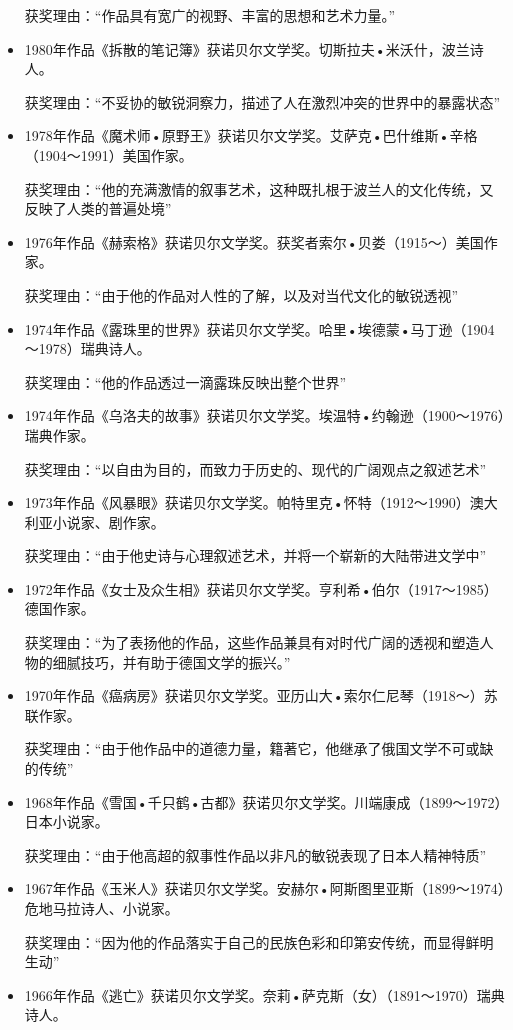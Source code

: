 \documentclass[UTF8,a4paper,8pt]{ctexbook}
\begin{document}
\begin{itemize}
			获奖理由：“作品具有宽广的视野、丰富的思想和艺术力量。”
			\item 1980年作品《拆散的笔记簿》获诺贝尔文学奖。切斯拉夫•米沃什，波兰诗人。
			
			获奖理由：“不妥协的敏锐洞察力，描述了人在激烈冲突的世界中的暴露状态”
			\item 1978年作品《魔术师•原野王》获诺贝尔文学奖。艾萨克•巴什维斯•辛格（1904～1991）美国作家。
			
			获奖理由：“他的充满激情的叙事艺术，这种既扎根于波兰人的文化传统，又反映了人类的普遍处境”
			\item 1976年作品《赫索格》获诺贝尔文学奖。获奖者索尔•贝娄（1915～）美国作家。
			
			获奖理由：“由于他的作品对人性的了解，以及对当代文化的敏锐透视”
			\item 1974年作品《露珠里的世界》获诺贝尔文学奖。哈里•埃德蒙•马丁逊（1904～1978）瑞典诗人。
			
			获奖理由：“他的作品透过一滴露珠反映出整个世界”
			\item 1974年作品《乌洛夫的故事》获诺贝尔文学奖。埃温特•约翰逊（1900～1976）瑞典作家。
			
			获奖理由：“以自由为目的，而致力于历史的、现代的广阔观点之叙述艺术”
			\item 1973年作品《风暴眼》获诺贝尔文学奖。帕特里克•怀特（1912～1990）澳大利亚小说家、剧作家。
			
			获奖理由：“由于他史诗与心理叙述艺术，并将一个崭新的大陆带进文学中”
			\item 1972年作品《女士及众生相》获诺贝尔文学奖。亨利希•伯尔（1917～1985）德国作家。
			
			获奖理由：“为了表扬他的作品，这些作品兼具有对时代广阔的透视和塑造人物的细腻技巧，并有助于德国文学的振兴。”
			\item 1970年作品《癌病房》获诺贝尔文学奖。亚历山大•索尔仁尼琴（1918～）苏联作家。
			
			获奖理由：“由于他作品中的道德力量，籍著它，他继承了俄国文学不可或缺的传统”
			\item 1968年作品《雪国•千只鹤•古都》获诺贝尔文学奖。川端康成（1899～1972）日本小说家。
			
			获奖理由：“由于他高超的叙事性作品以非凡的敏锐表现了日本人精神特质”
			\item 1967年作品《玉米人》获诺贝尔文学奖。安赫尔•阿斯图里亚斯（1899～1974）危地马拉诗人、小说家。
			
			获奖理由：“因为他的作品落实于自己的民族色彩和印第安传统，而显得鲜明生动”
			\item 1966年作品《逃亡》获诺贝尔文学奖。奈莉•萨克斯（女）（1891～1970）瑞典诗人。
			

\end{itemize}
\end{document}
